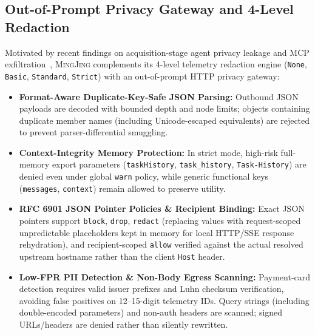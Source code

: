 \documentclass[10pt,twocolumn,letterpaper]{article}
\newcommand{\sys}{\textsc{MingJing}}
\newcommand{\code}[1]{\texttt{\small #1}}
\begin{document}
\subsection{Out-of-Prompt Privacy Gateway and 4-Level Redaction}
Motivated by recent findings on acquisition-stage agent privacy leakage and MCP exfiltration~\cite{flowseal2026,minim2026,sope2026,privacypeek2026}, \sys{} complements its 4-level telemetry redaction engine (\code{None}, \code{Basic}, \code{Standard}, \code{Strict}) with an out-of-prompt HTTP privacy gateway:
\begin{itemize}
  \item \textbf{Format-Aware Duplicate-Key-Safe JSON Parsing:} Outbound JSON payloads are decoded with bounded depth and node limits; objects containing duplicate member names (including Unicode-escaped equivalents) are rejected to prevent parser-differential smuggling.
  \item \textbf{Context-Integrity Memory Protection:} In strict mode, high-risk full-memory export parameters (\code{taskHistory}, \code{task\_history}, \code{Task-History}) are denied even under global \code{warn} policy, while generic functional keys (\code{messages}, \code{context}) remain allowed to preserve utility.
  \item \textbf{RFC 6901 JSON Pointer Policies \& Recipient Binding:} Exact JSON pointers support \code{block}, \code{drop}, \code{redact} (replacing values with request-scoped unpredictable placeholders kept in memory for local HTTP/SSE response rehydration), and recipient-scoped \code{allow} verified against the actual resolved upstream hostname rather than the client \code{Host} header.
  \item \textbf{Low-FPR PII Detection \& Non-Body Egress Scanning:} Payment-card detection requires valid issuer prefixes and Luhn checksum verification, avoiding false positives on 12--15-digit telemetry IDs. Query strings (including double-encoded parameters) and non-auth headers are scanned; signed URLs/headers are denied rather than silently rewritten.
\end{itemize}
\end{document}
